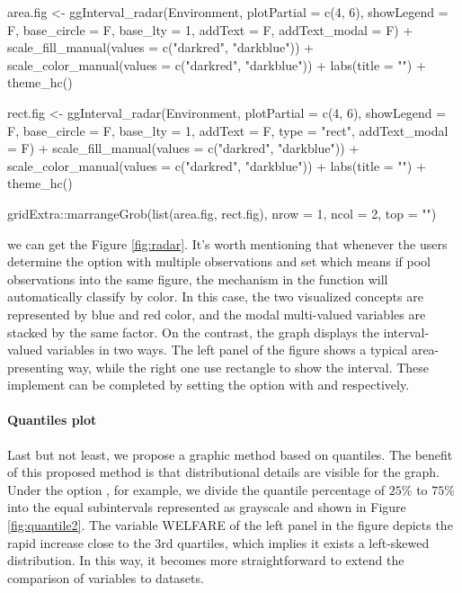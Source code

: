 \documentclass[article]{jss}
\begin{document}
\begin{CodeChunk}
\begin{CodeInput}
area.fig <- ggInterval_radar(Environment, plotPartial = c(4, 6),
                             showLegend = F, base_circle = F,
                             base_lty = 1, addText = F,
                             addText_modal = F) +
            scale_fill_manual(values = c("darkred", "darkblue")) +
            scale_color_manual(values = c("darkred", "darkblue")) +
            labs(title = "") +
            theme_hc()

rect.fig <- ggInterval_radar(Environment, plotPartial = c(4, 6),
                             showLegend = F, base_circle = F,
                             base_lty = 1, addText = F, type = "rect",
                             addText_modal = F) +
            scale_fill_manual(values = c("darkred", "darkblue")) +
            scale_color_manual(values = c("darkred", "darkblue")) +
            labs(title = "") +
            theme_hc()

gridExtra::marrangeGrob(list(area.fig, rect.fig), 
                        nrow = 1, ncol = 2, top = "")
\end{CodeInput}
\end{CodeChunk}

we can get the Figure \ref{fig:radar}. It's worth mentioning that whenever the users determine the option  with multiple observations and set  which means if pool observations into the same figure, the mechanism in the function will automatically classify by color. In this case, the two visualized concepts are represented by blue and red color, and the modal multi-valued variables are stacked by the same factor. On the contrast, the graph displays the interval-valued variables in two ways. The left panel of the figure shows a typical area-presenting way, while the right one use rectangle to show the interval. These implement can be completed by setting the option  with  and  respectively.




\paragraph{Quantiles plot}
Last but not least, we propose a graphic method based on quantiles. The benefit of this proposed method is that distributional details are visible for the graph. Under the option , for example, we divide the quantile percentage of $25\%$ to $75\%$ into the equal subintervals represented as grayscale and shown in Figure \ref{fig:quantile2}. The variable WELFARE of the left panel in the figure depicts the rapid increase close to the 3rd quartiles, which implies it exists a left-skewed distribution. In this way, it becomes more straightforward to extend the comparison of variables to datasets.
\end{document}
